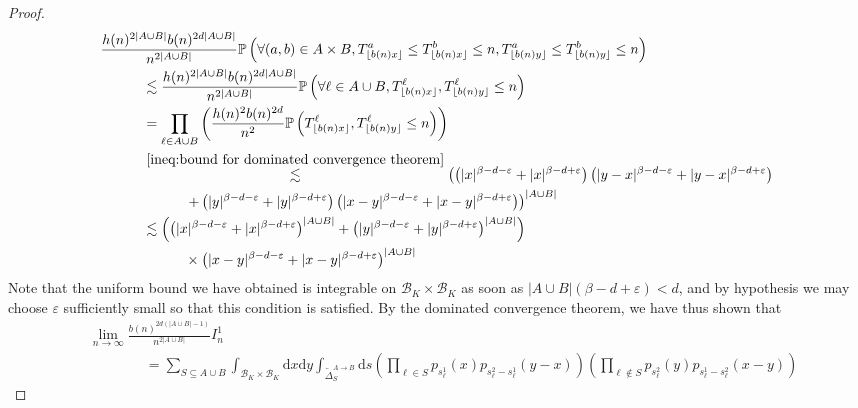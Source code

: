 \documentclass[12pt]{article}
\newcommand{\PP}{\mathbb P}
\newcommand{\1}{\mathds{1}}
\renewcommand{\d}{\mathrm d}
\numberwithin{equation}{section}
\begin{document}
\begin{proof}
    \begin{align*}
        &\frac{h(n)^{2|A\cup B|}b(n)^{2d|A\cup B|}}{n^{2|A\cup B|}}\PP\left(\forall(a,b)\in A\times B, T_{\lfloor b(n)x\rfloor}^a\le T_{\lfloor b(n)x\rfloor}^b\le n,T_{\lfloor b(n)y\rfloor}^a\le T_{\lfloor b(n)y\rfloor}^b\le n\right)\\
        &\hspace{3em}\lesssim \frac{h(n)^{2|A\cup B|}b(n)^{2d|A\cup B|}}{n^{2|A\cup B|}}\PP\left(\forall\ell \in A\cup B, T_{\lfloor b(n) x\rfloor}^{\ell},T_{\lfloor b(n) y\rfloor}^{\ell}\le n\right)\\
        &\hspace{3em}=\prod_{\ell\in A\cup B}\left(\frac{h(n)^2b(n)^{2d}}{n^2}\PP\left(T_{\lfloor b(n) x\rfloor}^{{\ell}},T_{\lfloor b(n) y\rfloor}^{\ell}\le n\right)\right)\\
        &\hspace{3em}\overset{\eqref{ineq:bound for dominated convergence theorem}}{\lesssim}\left(\left(|x|^{\beta-d-\varepsilon}+|x|^{\beta-d+\varepsilon}\right)\left(|y-x|^{\beta-d-\varepsilon}+|y-x|^{\beta-d+\varepsilon}\right)\right.\\
        &\hspace{6em}\left.+\left(|y|^{\beta-d-\varepsilon}+|y|^{\beta-d+\varepsilon}\right)\left(|x-y|^{\beta-d-\varepsilon}+|x-y|^{\beta-d+\varepsilon}\right)\right)^{|A\cup B|}\\
        &\hspace{3em}\lesssim\left(\left(|x|^{\beta-d-\varepsilon}+|x|^{\beta-d+\varepsilon}\right)^{|A\cup B|}+\left(|y|^{\beta-d-\varepsilon}+|y|^{\beta-d+\varepsilon}\right)^{|A\cup B|}\right)\\
        &\hspace{6em}\times\left(|x-y|^{\beta-d-\varepsilon}+|x-y|^{\beta-d+\varepsilon}\right)^{|A\cup B|}
    \end{align*}
    Note that the uniform bound we have obtained is integrable on $\mathcal B_K\times\mathcal B_K$ as soon as $|A\cup B|(\beta-d+\varepsilon)<d$, and by hypothesis we may choose $\varepsilon$ sufficiently small so that this condition is satisfied. By the dominated convergence theorem, we have thus shown that
    \begin{align*}
        &\lim_{n\rightarrow\infty}\frac{b(n)^{2d(|A\cup B|-1)}}{n^{2|A\cup B|}}I_n^1\\
        &\hspace{4em}=\sum_{S\subseteq A\cup B}\int_{\mathcal B_K\times\mathcal B_K}\d x\d y\int_{\widetilde\Delta_S^{A\rightarrow B}}\d s\left(\prod_{\ell\in S}p_{s_\ell^1}(x) p_{s_\ell^2-s_\ell^1}(y-x)\right)\left(\prod_{\ell\notin S}p_{s_\ell^2}(y) p_{s_\ell^1-s_\ell^2}(x-y)\right)

\end{align*}
\end{proof}
\end{document}
